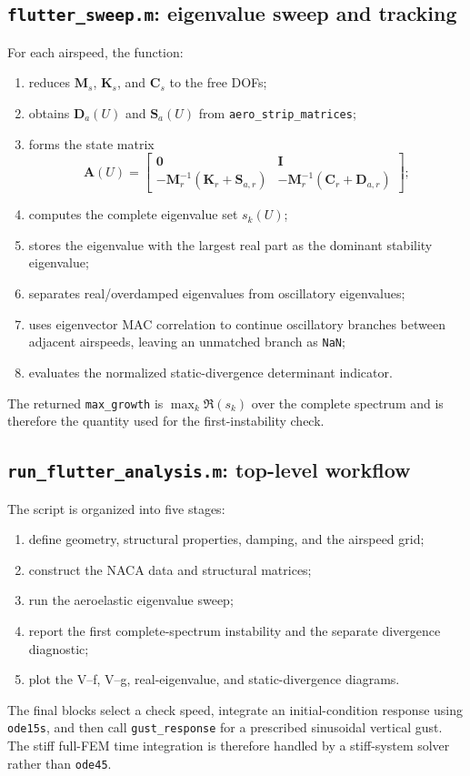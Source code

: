 \documentclass[11pt]{article}
\begin{document}
\subsection{\texttt{flutter\_sweep.m}: eigenvalue sweep and tracking}

For each airspeed, the function:
\begin{enumerate}
\item reduces $\bm M_s$, $\bm K_s$, and $\bm C_s$ to the free DOFs;
\item obtains $\bm D_a(U)$ and $\bm S_a(U)$ from
 \texttt{aero\_strip\_matrices};
\item forms the state matrix
\begin{equation}
 \bm A(U)=
 \begin{bmatrix}
 \bm 0 & \bm I\\
 -\bm M_r^{-1}(\bm K_r+\bm S_{a,r}) &
 -\bm M_r^{-1}(\bm C_r+\bm D_{a,r})
 \end{bmatrix};
\end{equation}
\item computes the complete eigenvalue set $s_k(U)$;
\item stores the eigenvalue with the largest real part as the dominant stability
 eigenvalue;
\item separates real/overdamped eigenvalues from oscillatory eigenvalues;
\item uses eigenvector MAC correlation to continue oscillatory branches between adjacent
 airspeeds, leaving an unmatched branch as \texttt{NaN};
\item evaluates the normalized static-divergence determinant indicator.
\end{enumerate}
The returned \texttt{max\_growth} is $\max_k\Re(s_k)$ over the complete spectrum and
is therefore the quantity used for the first-instability check.

\subsection{\texttt{run\_flutter\_analysis.m}: top-level workflow}

The script is organized into five stages:
\begin{enumerate}
\item define geometry, structural properties, damping, and the airspeed grid;
\item construct the NACA data and structural matrices;
\item run the aeroelastic eigenvalue sweep;
\item report the first complete-spectrum instability and the separate divergence
 diagnostic;
\item plot the V--f, V--g, real-eigenvalue, and static-divergence diagrams.
\end{enumerate}
The final blocks select a check speed, integrate an initial-condition response using
\texttt{ode15s}, and then call \texttt{gust\_response} for a prescribed sinusoidal
vertical gust. The stiff full-FEM time integration is therefore handled by a
stiff-system solver rather than \texttt{ode45}.
\end{document}
